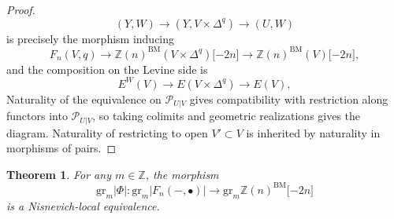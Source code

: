 \documentclass[11pt, twoside]{article}
\numberwithin{equation}{section}
\newtheorem{theorem}[equation]{Theorem}
\theoremstyle{definition}
\newcommand{\bb}[1]{\mathbb{#1}}
\newcommand{\gr}{\mathrm{gr}}
\newcommand{\bm}{\mathrm{BM}}
\begin{document}
\begin{proof}
\[(Y, W) \to (Y, V \times \Delta^q) \to (U, W)\]
is precisely the morphism inducing 
\[F_n(V, q) \to \bb{Z}(n)^\bm(V \times \Delta^q)\lbrack -2n \rbrack \to \bb{Z}(n)^\bm(V)\lbrack -2n \rbrack,\]
and the composition on the Levine side is 
\[E^W(V) \to E(V \times \Delta^q) \to E(V),\]
Naturality of the equivalence on \(\mathcal{P}_{U|V}\) gives compatibility with restriction along functors into \(\mathcal{P}_{U|V}\), so taking colimits and geometric realizations gives the diagram. Naturality of restricting to open \(V' \subset V\) is inherited by naturality in morphisms of pairs.
\end{proof}

\begin{theorem}
For any \(m \in \bb{Z}\), the morphism 
\[\gr_m |\Phi| \colon \gr_m |F_n( -, \bullet)| \to \gr_m \bb{Z}(n)^\bm \lbrack -2n \rbrack\]
is a Nisnevich-local equivalence.
\end{theorem}
\end{document}

